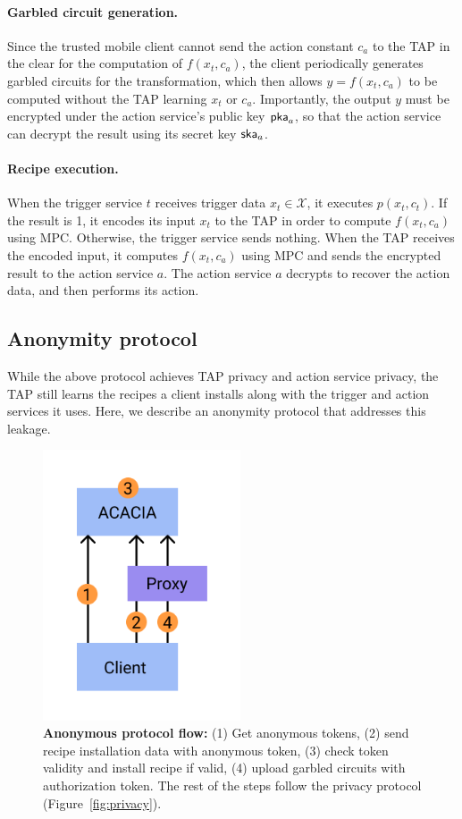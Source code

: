 \paragraph{Garbled circuit generation.}
Since the trusted mobile client cannot send the action constant $c_a$ to the TAP
in the clear for the computation of $f(x_t, c_a)$, the client periodically
generates garbled circuits for the transformation, which then allows $y = f(x_t,
c_a)$ to be computed without the TAP learning $x_t$ or $c_a$. Importantly, the
output $y$ must be encrypted under the action service's public key $\mathsf{pka}_a$, so
that the action service can decrypt the result using its secret key $\mathsf{ska}_a$.

\paragraph{Recipe execution.}
When the trigger service $t$ receives trigger data $x_t \in \mathcal{X}$, it
executes $p(x_t, c_t)$. If the result is 1, it encodes its input $x_t$ to the
TAP in order to compute $f(x_t, c_a)$ using MPC. Otherwise, the trigger service
sends nothing. When the TAP receives the encoded input, it computes $f(x_t,
c_a)$ using MPC and sends the encrypted result to the action service $a$. The
action service $a$ decrypts to recover the action data, and then performs its
action.

\subsection{Anonymity protocol}
While the above protocol achieves TAP privacy and action service privacy, the
TAP still learns the recipes a client installs along with the trigger and action
services it uses. Here, we describe an anonymity protocol that addresses this
leakage.

\begin{figure}
\includegraphics[height=8cm]{graphics/Proxy1.png}
\caption{\textbf{Anonymous protocol flow:} (1) Get anonymous tokens, (2) send
  recipe installation data with anonymous token, (3) check token validity and
  install recipe if valid, (4) upload garbled circuits with authorization
  token. The rest of the steps follow the privacy protocol
  (Figure~\ref{fig:privacy}).}
\label{fig:anonymity}
\end{figure}

